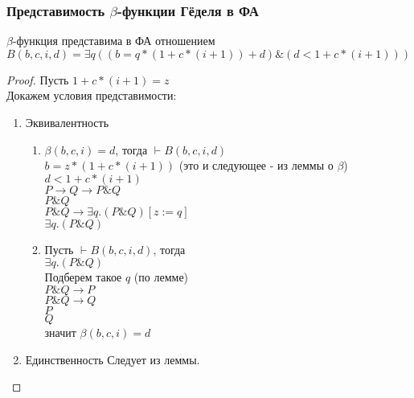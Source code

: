 \subsubsection{Представимость \texorpdfstring{$\beta$}{бета}-функции Гёделя в ФА}
\label{sec-11-3-4}
\begin{lemma}
$\beta$-функция представима в ФА отношением\\
$B(b,c,i,d) = \exists q((b = q * (1 + c * (i + 1)) + d) \& (d < 1 + c * (i + 1)))$
\end{lemma}
\begin{proof}
Пусть $1 + c * (i + 1) = z$\\
Докажем условия представимости:
\begin{enumerate}
\item Эквивалентность
\begin{enumerate}
\item $\beta(b,c,i) = d$, тогда $\vdash B(b,c,i,d)$\\
$b = z * (1 + c * (i + 1))$ (это и следующее - из леммы о $\beta$)\\
$d < 1 + c * (i + 1)$\\
$P \to Q \to P \& Q$\\
$P \& Q$\\
$P \& Q \to \exists q.(P \& Q) [z:= q]$\\
$\exists q.(P \& Q)$
\item Пусть $\vdash B(b,c,i,d)$, тогда\\
$\exists q.(P \& Q)$\\
Подберем такое $q$ (по лемме)\\
$P \& Q \to P$\\
$P \& Q \to Q$\\
$P$\\
$Q$\\
значит $\beta(b,c,i) = d$
\end{enumerate}
\item Единственность
Следует из леммы.
\end{enumerate}
\end{proof}
